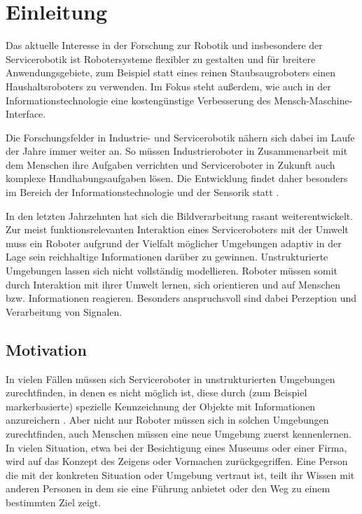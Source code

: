 
\chapter{Einleitung}
\label{einleitung_cha}
\authorsection{\editorabel}

Das aktuelle Interesse in der Forschung zur Robotik und insbesondere der Servicerobotik ist Robotersysteme flexibler zu gestalten und für breitere Anwendungsgebiete, zum Beispiel statt eines reinen Staubsaugroboters einen Haushaltsroboters zu verwenden. Im Fokus steht außerdem, wie auch in der Informationstechnologie eine kostengünstige Verbesserung des Mensch-Maschine-Interface\cite{kinect_1}.

Die Forschungsfelder in Industrie- und Servicerobotik nähern sich dabei im Laufe der Jahre immer weiter an.
So müssen Industrieroboter in Zusammenarbeit mit dem Menschen ihre Aufgaben verrichten und Serviceroboter in Zukunft auch komplexe Handhabungsaufgaben lösen.
Die Entwicklung findet daher besonders im Bereich der Informationstechnologie und der Sensorik statt  \cite{kinect_2}.

In den letzten Jahrzehnten hat sich die Bildverarbeitung rasant weiterentwickelt.
Zur meist funktionsrelevanten Interaktion eines Serviceroboters mit der Umwelt muss ein Roboter aufgrund der Vielfalt möglicher Umgebungen adaptiv in der Lage sein reichhaltige Informationen darüber zu gewinnen.
Unstrukturierte Umgebungen lassen sich nicht vollständig modellieren.
Roboter müssen somit durch Interaktion mit ihrer Umwelt lernen, sich orientieren und auf Menschen bzw. Informationen reagieren.
Besonders anspruchsvoll sind dabei Perzeption und Verarbeitung von Signalen.



\authorsection{\editorjulian, \editortobias}

\section{Motivation}
\label{motivation_real_sec}


In vielen Fällen müssen sich Serviceroboter in unstrukturierten Umgebungen zurechtfinden, in denen es nicht möglich ist, diese durch
 (zum Beispiel markerbasierte) spezielle Kennzeichnung der Objekte mit Informationen anzureichern \citep{sturm10rss-workshop}. Aber nicht nur Roboter müssen sich in solchen Umgebungen zurechtfinden, auch Menschen müssen eine neue Umgebung zuerst kennenlernen. In vielen Situation, etwa bei der Besichtigung eines Museums oder einer Firma, wird auf das Konzept des Zeigens oder Vormachen zurückgegriffen. Eine Person die mit der konkreten Situation oder Umgebung vertraut ist, teilt ihr Wissen mit anderen Personen in dem sie eine Führung anbietet oder den Weg zu einem bestimmten Ziel zeigt.

